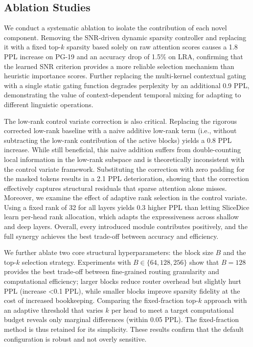 \documentclass{article}
\begin{document}
\subsection{Ablation Studies}

We conduct a systematic ablation to isolate the contribution of each novel component. Removing the SNR-driven dynamic sparsity controller and replacing it with a fixed top-$k$ sparsity based solely on raw attention scores causes a 1.8 PPL increase on PG-19 and an accuracy drop of 1.5\% on LRA, confirming that the learned SNR criterion provides a more reliable selection mechanism than heuristic importance scores. Further replacing the multi-kernel contextual gating with a single static gating function degrades perplexity by an additional 0.9 PPL, demonstrating the value of context-dependent temporal mixing for adapting to different linguistic operations.

The low-rank control variate correction is also critical. Replacing the rigorous corrected low-rank baseline with a naive additive low-rank term (i.e., without subtracting the low-rank contribution of the active blocks) yields a 0.8 PPL increase. While still beneficial, this naive addition suffers from double-counting local information in the low-rank subspace and is theoretically inconsistent with the control variate framework. Substituting the correction with zero padding for the masked tokens results in a 2.1 PPL deterioration, showing that the correction effectively captures structural residuals that sparse attention alone misses. Moreover, we examine the effect of adaptive rank selection in the control variate. Using a fixed rank of 32 for all layers yields 0.3 higher PPL than letting SliceDice learn per-head rank allocation, which adapts the expressiveness across shallow and deep layers. Overall, every introduced module contributes positively, and the full synergy achieves the best trade-off between accuracy and efficiency.

We further ablate two core structural hyperparameters: the block size $B$ and the top-$k$ selection strategy. Experiments with $B \in \{64, 128, 256\}$ show that $B=128$ provides the best trade-off between fine-grained routing granularity and computational efficiency; larger blocks reduce router overhead but slightly hurt PPL (increase <0.1 PPL), while smaller blocks improve sparsity fidelity at the cost of increased bookkeeping. Comparing the fixed-fraction top-$k$ approach with an adaptive threshold that varies $k$ per head to meet a target computational budget reveals only marginal differences (within 0.05 PPL). The fixed-fraction method is thus retained for its simplicity. These results confirm that the default configuration is robust and not overly sensitive.
\end{document}
